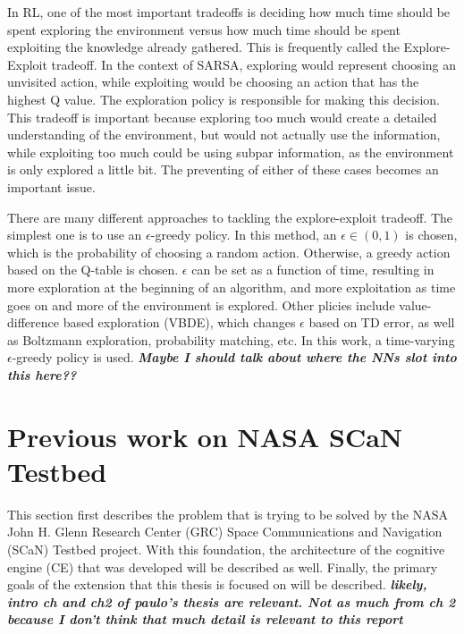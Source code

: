 	\par In RL, one of the most important tradeoffs is deciding how much time should be spent exploring the environment versus how much time should be spent exploiting the knowledge already gathered. This is frequently called the Explore-Exploit tradeoff. In the context of SARSA, exploring would represent choosing an unvisited action, while exploiting would be choosing an action that has the highest Q value. The exploration policy is responsible for making this decision. This tradeoff is important because exploring too much would create a detailed understanding of the environment, but would not actually use the information, while exploiting too much could be using subpar information, as the environment is only explored a little bit. The preventing of either of these cases becomes an important issue. 
	\par There are many different approaches to tackling the explore-exploit tradeoff. The simplest one is to use an $\epsilon$-greedy policy. In this method, an $\epsilon \in (0,1)$ is chosen, which is the probability of choosing a random action. Otherwise, a greedy action based on the Q-table is chosen. $\epsilon$ can be set as a function of time, resulting in more exploration at the beginning of an algorithm, and more exploitation as time goes on and more of the environment is explored. Other plicies include value-difference based exploration (VBDE), which changes $\epsilon$ based on TD error, as well as Boltzmann exploration, probability matching, etc. In this work, a time-varying $\epsilon$-greedy policy is used. 
	\textbf{\textit{Maybe I should talk about where the NNs slot into this here??}}
	
	\section{Previous work on NASA SCaN Testbed}
	\par This section first describes the problem that is trying to be solved by the NASA John H. Glenn Research Center (GRC) Space Communications and Navigation (SCaN) Testbed project. With this foundation, the architecture of the cognitive engine (CE) that was developed will be described as well. Finally, the primary goals of the extension that this thesis is focused on will be described.
	\textbf{\textit{likely, intro ch and ch2 of paulo's thesis are relevant. Not as much from ch 2 because I don't think that much detail is relevant to this report}}
